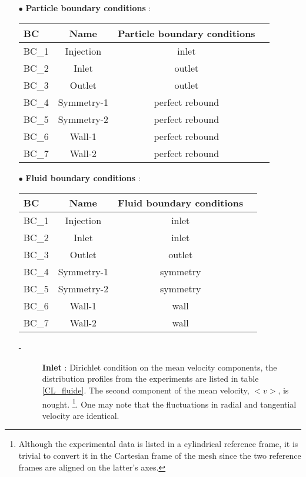 \begin{itemize}
\item[$\bullet$] \textbf{Particle boundary conditions} :
%
\begin{table}[H]
   \begin{center}
      \begin{tabular}{lccc}
         \hline\hline
            BC & Name & Particle boundary conditions           \\      
         \hline
         BC\_1 & Injection 	& inlet \\
         BC\_2 & Inlet 	& outlet \\
         BC\_3 & Outlet	& outlet \\
         BC\_4 & Symmetry-1 	& perfect rebound \\
         BC\_5 & Symmetry-2 	& perfect rebound \\
         BC\_6 & Wall-1 	& perfect rebound \\
         BC\_7 & Wall-2 	& perfect rebound \\
         \hline\hline
      \end{tabular}
   \end{center}
\end{table}
%

\item[$\bullet$] \textbf{Fluid boundary conditions} :

\begin{table}[H]
   \begin{center}
      \begin{tabular}{lccc}
         \hline\hline
            BC & Name & Fluid boundary conditions  \\      
         \hline
         BC\_1 & Injection 	& inlet \\
         BC\_2 & Inlet 	& inlet \\
         BC\_3 & Outlet	& outlet \\
         BC\_4 & Symmetry-1 	& symmetry \\
         BC\_5 & Symmetry-2 	& symmetry \\
         BC\_6 & Wall-1 	& wall	 \\
         BC\_7 & Wall-2 	& wall	 \\
         \hline\hline
      \end{tabular}
   \end{center}
\end{table}

\begin{description}
\item[-] \textbf{Inlet} : Dirichlet condition on the mean velocity components, the distribution profiles from the experiments are listed in table \ref{CL_fluide}. The second component of the mean velocity, $<v>$, is nought. \footnote{Although the experimental data is listed in a cylindrical reference frame, it is trivial to convert it in the Cartesian frame of the mesh since the two reference frames are aligned on the latter's axes.}. One may note that the fluctuations in radial and tangential velocity are identical.


\end{description}
\end{itemize}
